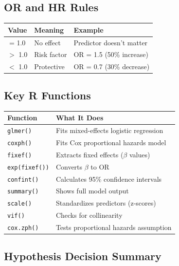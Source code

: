 \documentclass[11pt,a4paper]{article}
\begin{document}
\subsection{OR and HR Rules}

\begin{table}[h]
\centering
\begin{tabular}{@{}cll@{}}
\toprule
\textbf{Value} & \textbf{Meaning} & \textbf{Example} \\
\midrule
= 1.0 & No effect & Predictor doesn't matter \\
$>$ 1.0 & Risk factor & OR = 1.5 (50\% increase) \\
$<$ 1.0 & Protective & OR = 0.7 (30\% decrease) \\
\bottomrule
\end{tabular}
\end{table}

\subsection{Key R Functions}

\begin{table}[h]
\centering
\small
\begin{tabular}{@{}lp{8cm}@{}}
\toprule
\textbf{Function} & \textbf{What It Does} \\
\midrule
\texttt{glmer()} & Fits mixed-effects logistic regression \\
\texttt{coxph()} & Fits Cox proportional hazards model \\
\texttt{fixef()} & Extracts fixed effects ($\beta$ values) \\
\texttt{exp(fixef())} & Converts $\beta$ to OR \\
\texttt{confint()} & Calculates 95\% confidence intervals \\
\texttt{summary()} & Shows full model output \\
\texttt{scale()} & Standardizes predictors (z-scores) \\
\texttt{vif()} & Checks for collinearity \\
\texttt{cox.zph()} & Tests proportional hazards assumption \\
\bottomrule
\end{tabular}
\end{table}

\subsection{Hypothesis Decision Summary}
\end{document}
